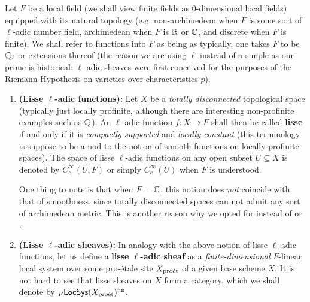             \begin{definition} \label{def: lisse_sheaves}
                Let $F$ be a local field (we shall view finite fields as $0$-dimensional local fields) equipped with its natural topology (e.g. non-archimedean when $F$ is some sort of $\ell$-adic number field, archimedean when $F$ is $\mathbb{R}$ or $\mathbb{C}$, and discrete when $F$ is finite). We shall refer to functions into $F$ as being  as typically, one takes $F$ to be $\mathbb{Q}_{\ell}$ or extensions thereof (the reason we are using $\ell$ instead of a simple  as our prime is historical: $\ell$-adic sheaves were first conceived for the purposes of the Riemann Hypothesis on varieties over characteristics $p$).
                \begin{enumerate}
                    \item \textbf{(Lisse $\ell$-adic functions):} Let $X$ be a \textit{totally disconnected} topological space (typically just locally profinite, although there are interesting non-profinite examples such as $\mathbb{Q}$). An $\ell$-adic function $f: X \to F$ shall then be called \textbf{lisse} if and only if it is \textit{compactly supported} and \textit{locally constant} (this terminology is suppose to be a nod to the notion of smooth functions on locally profinite spaces). The space of lisse $\ell$-adic functions on any open subset $U \subseteq X$ is denoted by $C^{\infty}_c(U, F)$ or simply $C^{\infty}_c(U)$ when $F$ is understood.
                    
                    One thing to note is that when $F = \mathbb{C}$, this notion does \textit{not} coincide with that of smoothness, since totally disconnected spaces can not admit any sort of archimedean metric. This is another reason why we opted for  instead of  or .
                    \item \textbf{(Lisse $\ell$-adic sheaves):} In analogy with the above notion of lisse $\ell$-adic functions, let us define a \textbf{lisse $\ell$-adic sheaf} as a \textit{finite-dimensional} $F$-linear local system over some pro-\'etale site $X_{\mathrm{pro\acute{e}t}}$ of a given base scheme $X$. It is not hard to see that lisse sheaves on $X$ form a category, which we shall denote by ${}_F\mathsf{LocSys}(X_{\mathrm{pro\acute{e}t}})^{\mathrm{fin}}$.
                \end{enumerate}
            \end{definition}
        
